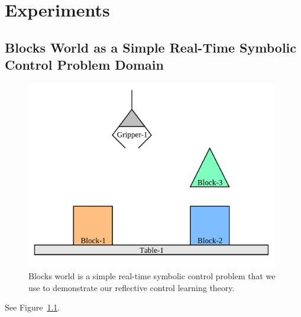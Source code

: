 \chapter{Experiments}\label{ch:experiments}

\section{Blocks World as a Simple Real-Time Symbolic Control Problem Domain}

\begin{figure}[bth]
  \center
  \includegraphics[width=11cm]{gfx/blocks_world_screenshot-1}
  \caption[Blocks world is a simple real-time symbolic control problem.]{Blocks world is a simple real-time symbolic control problem that we use to demonstrate our reflective control learning theory.}
  \label{fig:blocks_world_screenshot-1}
\end{figure}

See Figure~\ref{fig:blocks_world_screenshot-1}.

